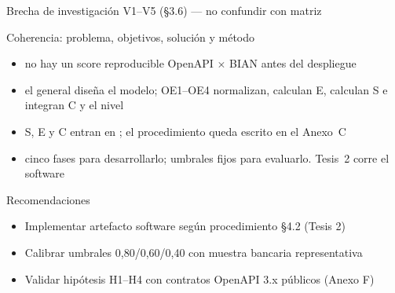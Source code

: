 \documentclass[aspectratio=169,11pt,spanish]{beamer}
\begin{document}
\begin{frame}{Brecha de investigación V1--V5 (§3.6) --- no confundir con matriz}
\end{frame}

\begin{frame}{Coherencia: problema, objetivos, solución y método}
  \begin{planpanel}
  \small
  \begin{itemize}
    \item {} no hay un score reproducible OpenAPI $\times$ BIAN antes del despliegue
    \item {} el general diseña el modelo; OE1--OE4 normalizan, calculan E, calculan S e integran C y el nivel
    \item {} S, E y C entran en \AlignmentScore{}; el procedimiento queda escrito en el Anexo~C
    \item {} cinco fases para desarrollarlo; umbrales fijos para evaluarlo. Tesis~2 corre el software
  \end{itemize}
  \end{planpanel}
\end{frame}

\begin{frame}{Recomendaciones}
  \begin{planpanel}
  \begin{itemize}
    \item Implementar artefacto software según procedimiento §4.2 (Tesis 2)
    \item Calibrar umbrales 0{,}80/0{,}60/0{,}40 con muestra bancaria representativa
    \item Validar hipótesis H1--H4 con contratos OpenAPI 3.x públicos (Anexo F)
  \end{itemize}
  \end{planpanel}
\end{frame}
\end{document}
